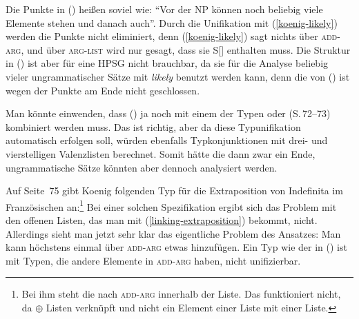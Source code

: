 \z
Die Punkte in () heißen soviel wie: "`Vor der NP können noch beliebig viele Elemente
stehen und danach auch"'. Durch die Unifikation mit (\ref{koenig-likely}) werden die Punkte
nicht eliminiert, denn (\ref{koenig-likely}) sagt nichts über \textsc{add-arg}, und über
\textsc{arg-list} wird nur gesagt, dass sie S[] enthalten muss.
Die Struktur in () ist aber für eine HPSG nicht brauchbar, da sie für
die Analyse beliebig vieler ungrammatischer Sätze mit \emph{likely} benutzt werden kann,
denn die \compsl von () ist wegen der Punkte am Ende nicht geschlossen.

Man könnte einwenden, dass () ja noch mit einem der Typen  oder
 (S.\,72--73) kombiniert werden muss. Das ist richtig, aber da diese Typunifikation
automatisch erfolgen soll, würden ebenfalls Typkonjunktionen mit drei- und vierstelligen
Valenzlisten berechnet. Somit hätte die \compsl dann zwar ein Ende, ungrammatische
Sätze könnten aber dennoch analysiert werden.

Auf Seite~75 gibt Koenig folgenden Typ für die Extraposition von Indefinita im Französischen an:\footnote{
  Bei ihm steht die  nach \textsc{add-arg} innerhalb der Liste. Das funktioniert nicht,
  da $\oplus$ Listen verknüpft und nicht ein Element einer Liste mit einer Liste.%
}
\ea
{}
\z
Bei einer solchen Spezifikation ergibt sich das Problem mit den offenen Listen,
das man mit (\ref{linking-extraposition}) bekommt, nicht. Allerdings sieht man jetzt
sehr klar das eigentliche Problem des Ansatzes: Man kann höchstens einmal über \textsc{add-arg}
etwas hinzufügen. Ein Typ wie der in () ist mit Typen, die andere Elemente
in \textsc{add-arg} haben, nicht unifizierbar.

